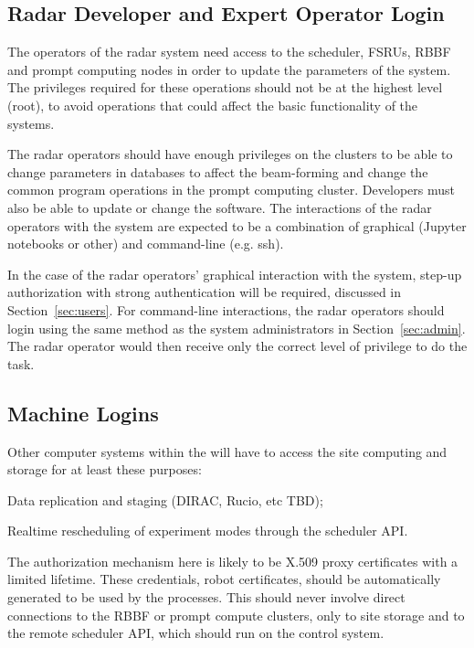 \documentclass[12pt,a4paper]{article}
\begin{document}
\subsection{Radar Developer and Expert Operator Login}
\label{sec:operator}
The operators of the radar system need access to the scheduler, FSRUs, RBBF and prompt computing nodes in order to update the parameters of the system.  The privileges required for these operations should not be at the highest level (root), to avoid operations that could affect the basic functionality of the systems.

The radar operators should have enough privileges on the clusters to be able to change parameters in databases to affect the beam-forming and change the common program operations in the prompt computing cluster.
Developers must also be able to update or change the software.
The interactions of the radar operators  with the system are expected to be a combination of graphical (Jupyter notebooks or other) and command-line (e.g. ssh).

In the case of the radar operators' graphical interaction with the system, step-up authorization with strong authentication will be required, discussed in Section~\ref{sec:users}.
For command-line interactions, the radar operators should login using the same method as the system administrators in Section~\ref{sec:admin}.
The radar operator would then receive only the correct level of privilege to do the task.

\subsection{Machine Logins}

Other computer systems within the \ED \einfra will have to access the site computing and storage for at least these purposes:
\bitm
\item Data replication and staging (DIRAC, Rucio, etc TBD);
\item Realtime rescheduling of experiment modes through the scheduler API.
\eitm

The authorization mechanism here is likely to be X.509 proxy certificates with a limited lifetime.
These credentials, robot certificates, should be automatically generated to be used by the processes.
This should never involve direct connections to the RBBF or prompt compute clusters, only to site storage and to the remote scheduler API, which should run on the control system.
\end{document}
